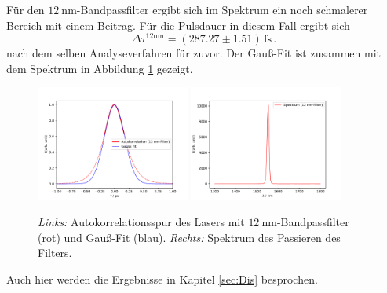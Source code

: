         Für den $\SI{12}{\nano\metre}$-Bandpassfilter ergibt sich im Spektrum ein noch schmalerer Bereich mit einem Beitrag. Für die Pulsdauer in diesem Fall ergibt sich
        \begin{equation}
            \Delta \tau^{\text{12nm}} = (287.27\pm 1.51)\,\text{fs} \, .
        \end{equation}
        nach dem selben Analyseverfahren für zuvor. Der Gauß-Fit ist zusammen mit dem Spektrum in Abbildung \ref{fig:12} gezeigt.
        \begin{figure}
            \centering
            \includegraphics[width = 0.45\textwidth]{pictures/Puls_12.pdf}
            \includegraphics[width = 0.45\textwidth]{pictures/Spektrum_12.pdf}
            \caption{\textit{Links:} Autokorrelationsspur des Lasers mit $\SI{12}{\nano\metre}$-Bandpassfilter (rot) und Gauß-Fit (blau). \textit{Rechts:} Spektrum des Passieren des Filters.}
            \label{fig:12}    
        \end{figure}
        Auch hier werden die Ergebnisse in Kapitel \ref{sec:Dis} besprochen.
